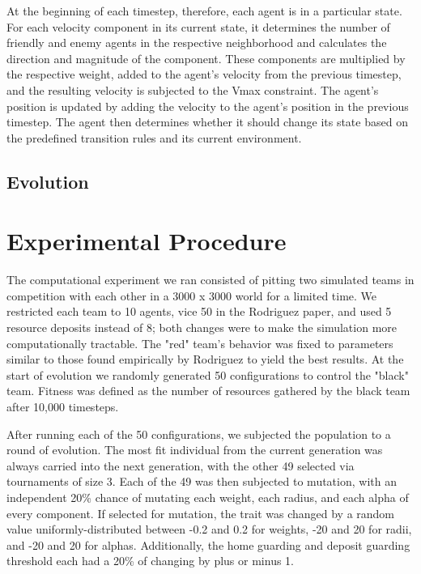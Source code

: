 \documentclass[12pt,journal,compsoc]{IEEEtran}
\begin{document}
At the beginning of each timestep, therefore, each agent is in a particular state. For each velocity component in its current state, it determines the number of friendly and enemy agents in the respective neighborhood and calculates the direction and magnitude of the component. These components are multiplied by the respective weight, added to the agent's velocity from the previous timestep, and the resulting velocity is subjected to the Vmax constraint. The agent's position is updated by adding the velocity to the agent's position in the previous timestep. The agent then determines whether it should change its state based on the predefined transition rules and its current environment.

\subsection{Evolution}

\section{Experimental Procedure}

The computational experiment we ran consisted of pitting two simulated teams in competition with each other in a 3000 x 3000 world for a limited time. We restricted each team to 10 agents, vice 50 in the Rodriguez paper, and used 5 resource deposits instead of 8; both changes were to make the simulation more computationally tractable. The "red" team's behavior was fixed to parameters similar to those found empirically by Rodriguez to yield the best results. At the start of evolution we randomly generated 50 configurations to control the "black" team. Fitness was defined as the number of resources gathered by the black team after 10,000 timesteps.

After running each of the 50 configurations, we subjected the population to a round of evolution. The most fit individual from the current generation was always carried into the next generation, with the other 49 selected via tournaments of size 3. Each of the 49 was then subjected to mutation, with an independent 20\% chance of mutating each weight, each radius, and each alpha of every component. If selected for mutation, the trait was changed by a random value uniformly-distributed between -0.2 and 0.2 for weights, -20 and 20 for radii, and -20 and 20 for alphas. Additionally, the home guarding and deposit guarding threshold each had a 20\% of changing by plus or minus 1.
\end{document}
